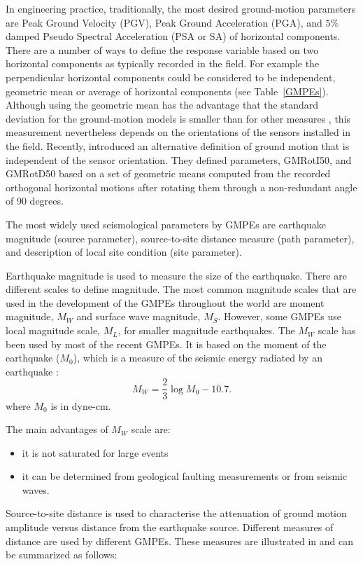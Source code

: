 In engineering practice, traditionally, the most desired
ground-motion parameters are Peak Ground Velocity (PGV), Peak Ground
Acceleration (PGA), and $5\%$ damped Pseudo Spectral Acceleration
(PSA or SA) of horizontal components. There are a number of ways to
define the response variable based on two horizontal components as
typically recorded in the field. For example the perpendicular
horizontal components could be considered to be independent,
geometric mean or average of horizontal components (see
Table~\ref{GMPEs}). Although using the geometric mean has the
advantage that the standard deviation for the ground-motion models
is smaller than for other measures \citep{eqrm_Beyer06}, this
measurement nevertheless depends on the orientations of the sensors
installed in the field. Recently, \citet{eqrm_Boore06} introduced an
alternative definition of ground motion that is independent of the
sensor orientation. They defined parameters, GMRotI50, and GMRotD50
based on a set of geometric means computed from the recorded
orthogonal horizontal motions after rotating them through a
non-redundant angle of 90 degrees.

The most widely used seismological parameters by GMPEs are
earthquake magnitude (source parameter), source-to-site distance
measure (path parameter), and description of local site condition
(site parameter).

Earthquake magnitude is used to measure the size of the earthquake.
There are different scales to define magnitude. The most common
magnitude scales that are used in the development of the GMPEs
throughout the world are moment magnitude, $M_W$ and surface wave
magnitude, $M_S$. However, some GMPEs use local magnitude scale,
$M_L$, for smaller magnitude earthquakes. The $M_W$ scale has been
used by most of the recent GMPEs. It is based on the moment of the
earthquake ($M_0$), which is a measure of the seismic energy
radiated by an earthquake \citep{eqrm_Hanks79}:
\begin{equation}\label{eq:MW}
M_W=\frac{2}{3}\log {M_0}-10.7.
\end{equation}
where $M_0$ is in dyne-cm.

The main advantages of $M_W$ scale are:
\begin{itemize}
\item it is not saturated for large events
\item it can be determined from geological faulting measurements
or from seismic waves.
\end{itemize}
Source-to-site distance is used to characterise the attenuation of
ground motion amplitude versus distance from the earthquake source.
Different measures of distance are used by different GMPEs. These
measures are illustrated in  and can be
summarized as follows:

